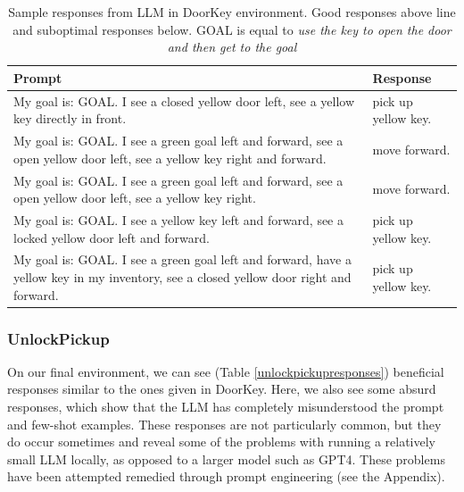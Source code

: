 \documentclass[conference]{IEEEtran}
\begin{document}
\begin{table}[h]
\caption{Sample responses from LLM in DoorKey environment. Good responses above line and suboptimal responses below. GOAL is equal to {\it use the key to open the door and then get to the goal}}
\begin{center}
\label{doorkeyresponses}
\begin{tabularx}{3.25in}{X | X}
Prompt & Response \\
\hline
My goal is: GOAL. I see a closed yellow door left, see a yellow key directly in front. & pick up yellow key. \\
My goal is: GOAL. I see a green goal left and forward, see a open yellow door left, see a yellow key right and forward. & move forward. \\
My goal is: GOAL. I see a green goal left and forward, see a open yellow door left, see a yellow key right. & move forward. \\
\hline
My goal is: GOAL. I see a yellow key left and forward, see a locked yellow door left and forward. & pick up yellow key. \\
My goal is: GOAL. I see a green goal left and forward, have a yellow key in my inventory, see a closed yellow door right and forward. & pick up yellow key.
\end{tabularx}
\end{center}
\end{table}

\subsubsection{UnlockPickup}

On our final environment, we can see (Table \ref{unlockpickupresponses}) beneficial responses similar to the ones given in DoorKey. Here, we also see some absurd responses, which show that the LLM has completely misunderstood the prompt and few-shot examples. These responses are not particularly common, but they do occur sometimes and reveal some of the problems with running a relatively small LLM locally, as opposed to a larger model such as GPT4. These problems have been attempted remedied through prompt engineering (see the Appendix).
\end{document}
